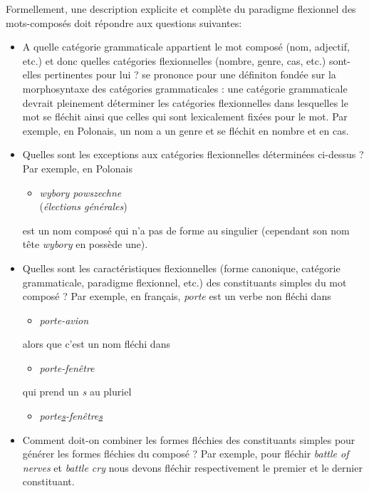 \bigskip
\noindent Formellement, une description explicite et complète du paradigme flexionnel des mots-composés doit répondre aux questions suivantes:

\begin{itemize}
\item A quelle catégorie grammaticale appartient le mot composé (nom, adjectif, etc.) et donc
quelles catégories flexionnelles (nombre, genre, cas, etc.) sont-elles pertinentes pour lui ?
\cite{PrzepWol03} se prononce pour une définiton fondée sur la morphosyntaxe des catégories
grammaticales : une catégorie grammaticale devrait pleinement déterminer les catégories
flexionnelles dans lesquelles le mot se fléchit ainsi que celles qui sont lexicalement fixées pour le
mot. Par exemple, en Polonais, un nom a un genre et se fléchit en nombre et en cas.
\item Quelles sont les exceptions aux catégories flexionnelles déterminées ci-dessus ? Par exemple,
en Polonais 

\begin{itemize}
\item \emph{wybory powszechne}\\
	(\emph{élections générales}) 
\end{itemize}

est un nom composé qui n'a pas de forme au singulier (cependant son nom tête \emph{wybory} en
	possède une).

\item Quelles sont les caractéristiques flexionnelles (forme canonique, catégorie grammaticale,
paradigme flexionnel, etc.) des constituants simples du mot composé ? Par exemple, en français,
\emph{porte} est un verbe non fléchi dans  

\begin{itemize}
\item \emph{porte-avion}
\end{itemize}

alors que c'est un nom fléchi dans
 
\begin{itemize}
\item \emph{porte-fenêtre}
\end{itemize}

qui prend un \emph{s} au pluriel

\begin{itemize}
\item \emph{porte\underline{s}-fenêtre\underline{s}}
\end{itemize}

\item Comment doit-on combiner les formes fléchies des constituants simples pour générer les formes fléchies du composé ? Par exemple, pour fléchir \emph{battle of nerves} et \emph{battle cry} nous devons fléchir respectivement le premier et le dernier constituant. 
\end{itemize}

